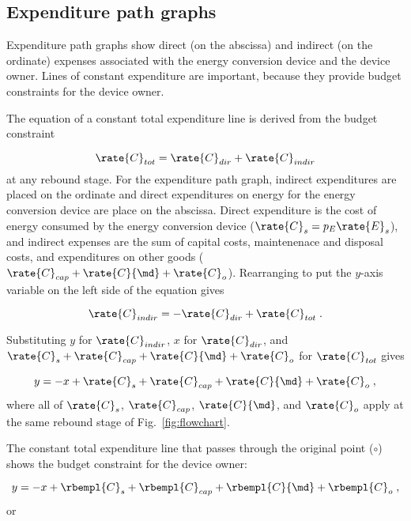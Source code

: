 \subsection{Expenditure path graphs}
\label{sec:expenditure_path_graph_details}

Expenditure path graphs show direct (on the abscissa) and indirect (on the ordinate)
expenses associated with the energy conversion device 
and the device owner.
Lines of constant expenditure are important, 
because they provide budget constraints for the device owner.

The equation of a constant total expenditure line is derived from 
the budget constraint

\begin{equation}
  \rate{C}_{tot} = \rate{C}_{dir} + \rate{C}_{indir}
\end{equation}
%
at any rebound stage.
For the expenditure path graph,
indirect expenditures are placed on the ordinate
and direct expenditures on energy for the energy conversion device are place on the abscissa.
Direct expenditure is the cost of energy consumed by the energy conversion device
($\rate{C}_s = p_E \rate{E}_s$), and 
indirect expenses are the sum of capital costs, 
maintenenace and disposal costs, and 
expenditures on other goods
($\rate{C}_{cap} + \rate{C}{\md} + \rate{C}_o$).
Rearranging to put the $y$-axis variable on the left side of the equation gives

\begin{equation}
  \rate{C}_{indir} = - \rate{C}_{dir} + \rate{C}_{tot} \; .
\end{equation}

Substituting $y$ for $\rate{C}_{indir}$, 
$x$ for $\rate{C}_{dir}$, and 
$\rate{C}_s + \rate{C}_{cap} + \rate{C}{\md} + \rate{C}_o$ for $\rate{C}_{tot}$
gives

\begin{equation}
  y = -x + \rate{C}_s + \rate{C}_{cap} + \rate{C}{\md} + \rate{C}_o \; ,
\end{equation}
%
where all of $\rate{C}_s$, $\rate{C}_{cap}$, $\rate{C}{\md}$, and $\rate{C}_o$
apply at the same rebound stage of Fig.~\ref{fig:flowchart}.

The constant total expenditure line 
that passes through the original point ($\circ$)
shows the budget constraint for the device owner:

\begin{equation}
  y = -x + \rbempl{C}_s + \rbempl{C}_{cap} + \rbempl{C}{\md} + \rbempl{C}_o \; ,
\end{equation}
%
or

